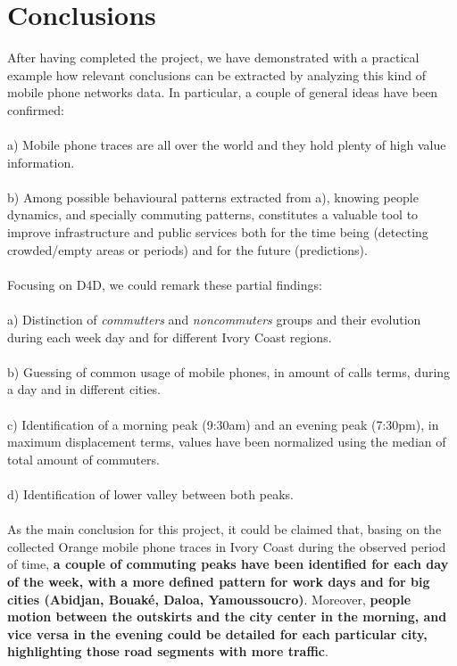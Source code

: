\newpage
\section{Conclusions}

After having completed the project, we have demonstrated with a practical example how relevant conclusions can be extracted by analyzing this kind of mobile phone networks data. In particular, a couple of general ideas have been confirmed:
\\
\\
a) Mobile phone traces are all over the world and they hold plenty of high value information.
\\
\\
b) Among possible behavioural patterns extracted from a), knowing people dynamics, and specially commuting patterns, constitutes a valuable tool to improve infrastructure and public services both for the time being (detecting crowded/empty areas or periods) and for the future (predictions).
\\
\\
Focusing on D4D, we could remark these partial findings:
\\
\\
a) Distinction of {\it commutters} and {\it noncommuters} groups and their evolution during each week day and for different Ivory Coast regions.
\\
\\
b) Guessing of common usage of mobile phones, in amount of calls terms, during a day and in different cities.
\\
\\
c) Identification of a morning peak (9:30am) and an evening peak (7:30pm), in maximum displacement terms, values have been normalized using the median of total amount of commuters.
\\
\\
d) Identification of lower valley between both peaks.
\\
\\
As the main conclusion for this project, it could be claimed that, basing on the collected Orange mobile phone traces in Ivory Coast during the observed period of time, {\bf a couple of commuting peaks have been identified for each day of the week, with a more defined pattern for work days and for big cities (Abidjan, Bouaké, Daloa, Yamoussoucro)}. Moreover, {\bf people motion between the outskirts and the city center in the morning, and vice versa in the evening could be detailed for each particular city, highlighting those road segments with more traffic}.
